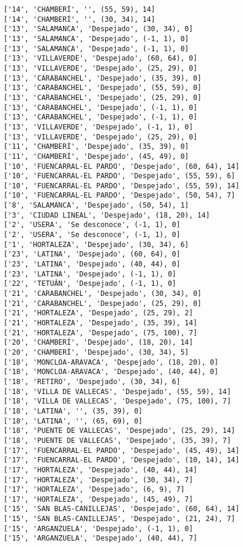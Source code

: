 \documentclass[11pt]{article}
\begin{document}
\begin{Verbatim}[commandchars=\\\{\}]
['14', 'CHAMBERÍ', '', (55, 59), 14]
['14', 'CHAMBERÍ', '', (30, 34), 14]
['13', 'SALAMANCA', 'Despejado', (30, 34), 0]
['13', 'SALAMANCA', 'Despejado', (-1, 1), 0]
['13', 'SALAMANCA', 'Despejado', (-1, 1), 0]
['13', 'VILLAVERDE', 'Despejado', (60, 64), 0]
['13', 'VILLAVERDE', 'Despejado', (25, 29), 0]
['13', 'CARABANCHEL', 'Despejado', (35, 39), 0]
['13', 'CARABANCHEL', 'Despejado', (55, 59), 0]
['13', 'CARABANCHEL', 'Despejado', (25, 29), 0]
['13', 'CARABANCHEL', 'Despejado', (-1, 1), 0]
['13', 'CARABANCHEL', 'Despejado', (-1, 1), 0]
['13', 'VILLAVERDE', 'Despejado', (-1, 1), 0]
['13', 'VILLAVERDE', 'Despejado', (25, 29), 0]
['11', 'CHAMBERÍ', 'Despejado', (35, 39), 0]
['11', 'CHAMBERÍ', 'Despejado', (45, 49), 0]
['10', 'FUENCARRAL-EL PARDO', 'Despejado', (60, 64), 14]
['10', 'FUENCARRAL-EL PARDO', 'Despejado', (55, 59), 6]
['10', 'FUENCARRAL-EL PARDO', 'Despejado', (55, 59), 14]
['10', 'FUENCARRAL-EL PARDO', 'Despejado', (50, 54), 7]
['8', 'SALAMANCA', 'Despejado', (50, 54), 1]
['3', 'CIUDAD LINEAL', 'Despejado', (18, 20), 14]
['2', 'USERA', 'Se desconoce', (-1, 1), 0]
['2', 'USERA', 'Se desconoce', (-1, 1), 0]
['1', 'HORTALEZA', 'Despejado', (30, 34), 6]
['23', 'LATINA', 'Despejado', (60, 64), 0]
['23', 'LATINA', 'Despejado', (40, 44), 0]
['23', 'LATINA', 'Despejado', (-1, 1), 0]
['22', 'TETUÁN', 'Despejado', (-1, 1), 0]
['21', 'CARABANCHEL', 'Despejado', (30, 34), 0]
['21', 'CARABANCHEL', 'Despejado', (25, 29), 0]
['21', 'HORTALEZA', 'Despejado', (25, 29), 2]
['21', 'HORTALEZA', 'Despejado', (35, 39), 14]
['21', 'HORTALEZA', 'Despejado', (75, 100), 7]
['20', 'CHAMBERÍ', 'Despejado', (18, 20), 14]
['20', 'CHAMBERÍ', 'Despejado', (30, 34), 5]
['18', 'MONCLOA-ARAVACA', 'Despejado', (18, 20), 0]
['18', 'MONCLOA-ARAVACA', 'Despejado', (40, 44), 0]
['18', 'RETIRO', 'Despejado', (30, 34), 6]
['18', 'VILLA DE VALLECAS', 'Despejado', (55, 59), 14]
['18', 'VILLA DE VALLECAS', 'Despejado', (75, 100), 7]
['18', 'LATINA', '', (35, 39), 0]
['18', 'LATINA', '', (65, 69), 0]
['18', 'PUENTE DE VALLECAS', 'Despejado', (25, 29), 14]
['18', 'PUENTE DE VALLECAS', 'Despejado', (35, 39), 7]
['17', 'FUENCARRAL-EL PARDO', 'Despejado', (45, 49), 14]
['17', 'FUENCARRAL-EL PARDO', 'Despejado', (10, 14), 14]
['17', 'HORTALEZA', 'Despejado', (40, 44), 14]
['17', 'HORTALEZA', 'Despejado', (30, 34), 7]
['17', 'HORTALEZA', 'Despejado', (6, 9), 7]
['17', 'HORTALEZA', 'Despejado', (45, 49), 7]
['15', 'SAN BLAS-CANILLEJAS', 'Despejado', (60, 64), 14]
['15', 'SAN BLAS-CANILLEJAS', 'Despejado', (21, 24), 7]
['15', 'ARGANZUELA', 'Despejado', (-1, 1), 0]
['15', 'ARGANZUELA', 'Despejado', (40, 44), 7]

\end{Verbatim}
\end{document}
